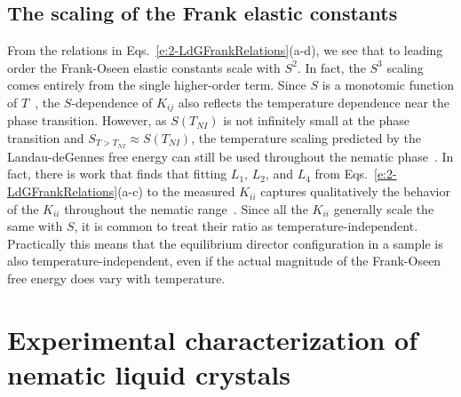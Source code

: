 \subsection{The scaling of the Frank elastic constants}
From the relations in Eqs.~\ref{e:2-LdGFrankRelations}(a-d), we see that to leading order the Frank-Oseen elastic constants scale with $S^2$.
In fact, the $S^3$ scaling comes entirely from the single higher-order term.
Since $S$ is a monotomic function of $T$~\cite{RN33}, the $S$-dependence of $K_{ij}$ also reflects the temperature dependence near the phase transition.
However, as $S(T_{NI})$ is not infinitely small at the phase transition and $S_{T > T_{NI}} \approx S(T_{NI})$, the temperature scaling predicted by the Landau-deGennes free energy can still be used throughout the nematic phase~\cite{RN198}.
In fact, there is work that finds that fitting $L_1$, $L_2$, and $L_4$ from Eqs.~\ref{e:2-LdGFrankRelations}(a-c) to the measured $K_{ii}$ captures qualitatively the behavior of the $K_{ii}$ throughout the nematic range~\cite{RN198}.
Since all the $K_{ii}$ generally scale the same with $S$, it is common to treat their ratio as temperature-independent.
Practically this means that the equilibrium director configuration in a sample is also temperature-independent, even if the actual magnitude of the Frank-Oseen free energy does vary with temperature.




\section{Experimental characterization of nematic liquid crystals}
